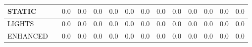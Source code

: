 \begin{table}[ht]
\begin{adjustbox}{width=\linewidth}
\begin{tabular}{l l c c c | c c c | c c c | c c c}
            \multicolumn{1}{l|}{STATIC} &&
            \multicolumn{1}{c}{$0.0$} &
            \multicolumn{1}{c}{$0.0$} &
            \multicolumn{1}{c}{$0.0$} &
            \multicolumn{1}{c}{$0.0$} &
            \multicolumn{1}{c}{$0.0$} &
            \multicolumn{1}{c}{$0.0$} &
            \multicolumn{1}{c}{$0.0$} &
            \multicolumn{1}{c}{$0.0$} &
            \multicolumn{1}{c}{$0.0$} &
            \multicolumn{1}{c}{$0.0$} &
            \multicolumn{1}{c}{$0.0$} &
            \multicolumn{1}{c}{$0.0$} & \\   
            \midrule \midrule
            \multicolumn{1}{l|}{LIGHTS} &&
            \multicolumn{1}{c}{$0.0$} &
            \multicolumn{1}{c}{$0.0$} &
            \multicolumn{1}{c}{$0.0$} &
            \multicolumn{1}{c}{$0.0$} &
            \multicolumn{1}{c}{$0.0$} &
            \multicolumn{1}{c}{$0.0$} &
            \multicolumn{1}{c}{$0.0$} &
            \multicolumn{1}{c}{$0.0$} &
            \multicolumn{1}{c}{$0.0$} &
            \multicolumn{1}{c}{$0.0$} &
            \multicolumn{1}{c}{$0.0$} &
            \multicolumn{1}{c}{$0.0$} & \\   

            \multicolumn{1}{l|}{ENHANCED} &&
            \multicolumn{1}{c}{$0.0$} &
            \multicolumn{1}{c}{$0.0$} &
            \multicolumn{1}{c}{$0.0$} &
            \multicolumn{1}{c}{$0.0$} &
            \multicolumn{1}{c}{$0.0$} &
            \multicolumn{1}{c}{$0.0$} &
            \multicolumn{1}{c}{$0.0$} &
            \multicolumn{1}{c}{$0.0$} &
            \multicolumn{1}{c}{$0.0$} &
            \multicolumn{1}{c}{$0.0$} &
            \multicolumn{1}{c}{$0.0$} &
            \multicolumn{1}{c}{$0.0$} & \\  
        
        \bottomrule\bottomrule

         \end{tabular}  
     \end{adjustbox}
    \label{tab:exp_results}
\end{table}
